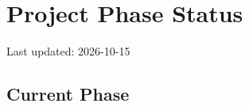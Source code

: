 \section{Project Phase Status}\label{cr:status:phase-status}

\begin{record}

Last updated: 2026-10-15

\end{record}

\subsection{Current Phase}\label{cr:status:phase-status:current-phase}

